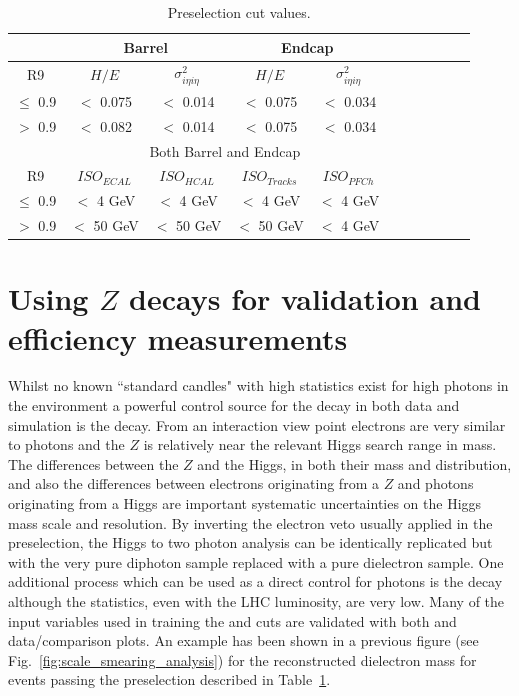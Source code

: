 \begin{table}
\noindent
  \begin{center}
  \caption{Preselection cut values.}
    \begin{tabular}{c | c c c c c c c c c c }
      \hline
                & \multicolumn{2}{c}{Barrel} & \multicolumn{2}{c}{Endcap} \\ 
      \hline
      R9        & $H/E$ & $\sigma^{2}_{i\eta i\eta}$ & $H/E$ & $\sigma^{2}_{i\eta i\eta}$  \\ 
      $\le$ 0.9 & $<$ 0.075 & $<$ 0.014 & $<$ 0.075 & $<$ 0.034 \\
      $>$ 0.9   & $<$ 0.082 & $<$ 0.014 & $<$ 0.075 & $<$ 0.034  \\ 
      \hline    
                & \multicolumn{4}{c}{Both Barrel and Endcap}\\ 
      \hline
      R9        & $ISO_{ECAL}$ & $ISO_{HCAL}$ &  $ISO_{Tracks}$ & $ISO_{PFCh}$ \\ 
      $\le$ 0.9 &$<$ 4 GeV & $<$ 4 GeV & $<$ 4 GeV & $<$ 4 GeV\\ 
      $>$ 0.9   &$<$ 50 GeV & $<$ 50 GeV & $<$ 50 GeV & $<$ 4 GeV\\ 
      \hline
    \end{tabular}
  \label{tab:preselection}
  \end{center}
\end{table}

\section{Using $Z$ decays for validation and efficiency measurements}
\label{sec:zee}

Whilst no known ``standard candles" with high statistics exist for high \pT photons in the \LHC environment a powerful control source for the \Hgg decay in both data and \MC simulation is the \Zee decay. From an \ECAL interaction view point electrons are very similar to photons and the $Z$ is relatively near the relevant Higgs search range in mass. The differences between the $Z$ and the Higgs, in both their mass and \pT distribution, and also the differences between electrons originating from a $Z$ and photons originating from a Higgs are important systematic uncertainties on the Higgs mass scale and resolution. By inverting the electron veto usually applied in the preselection, the Higgs to two photon analysis can be identically replicated but with the very pure diphoton sample replaced with a pure dielectron sample. One additional process which can be used as a direct control for photons is the \Zmumugamma decay although the statistics, even with the LHC luminosity, are very low. Many of the input variables used in training the \BDTs and cuts are validated with both \Zee and \Zmumugamma data/\MC comparison plots. An example has been shown in a previous figure (see Fig.~\ref{fig:scale_smearing_analysis}) for the reconstructed dielectron mass for events passing the preselection described in Table~\ref{tab:preselection}.

